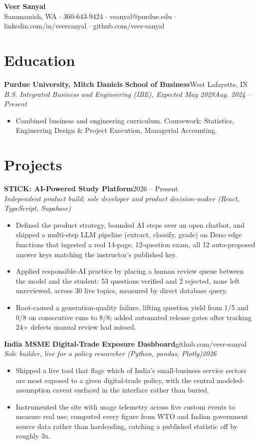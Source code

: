 \documentclass[10pt,letterpaper]{article}
\newcommand{\entry}[4]{%
  \textbf{#1}\hfill #2\\[1pt]
  \textit{#3}\hfill \textit{#4}\\[2pt]
}
\begin{document}
\begin{center}
  {\LARGE \textbf{Veer Sanyal}}\\[3pt]
  Sammamish, WA $\cdot$ 360-643-9424 $\cdot$ vsanyal@purdue.edu $\cdot$ linkedin.com/in/veersanyal $\cdot$ github.com/veer-sanyal
\end{center}

\section*{Education}
\textbf{Purdue University, Mitch Daniels School of Business}\hfill West Lafayette, IN\\[1pt]
\textit{B.S. Integrated Business and Engineering (IBE), Expected May 2028}\hfill \textit{Aug. 2024 -- Present}
\begin{itemize}
  \item Combined business and engineering curriculum. Coursework: Statistics, Engineering Design \& Project Execution, Managerial Accounting.
\end{itemize}

\section*{Projects}
\entry{STICK: AI-Powered Study Platform}{2026 -- Present}{Independent product build; sole developer and product decision-maker (React, TypeScript, Supabase)}{}
\begin{itemize}
  \item Defined the product strategy, bounded AI steps over an open chatbot, and shipped a multi-step LLM pipeline (extract, classify, grade) on Deno edge functions that ingested a real 14-page, 12-question exam, all 12 auto-proposed answer keys matching the instructor's published key.
  \item Applied responsible-AI practice by placing a human review queue between the model and the student: 53 questions verified and 2 rejected, none left unreviewed, across 30 live topics, measured by direct database query.
  \item Root-caused a generation-quality failure, lifting question yield from 1/5 and 0/8 on consecutive runs to 8/8; added automated release gates after tracking 24+ defects manual review had missed.
\end{itemize}

\entry{India MSME Digital-Trade Exposure Dashboard}{github.com/veer-sanyal}{Sole builder, live for a policy researcher (Python, pandas, Plotly)}{2026}
\begin{itemize}
  \item Shipped a live tool that flags which of India's small-business service sectors are most exposed to a given digital-trade policy, with the central modeled-assumption caveat surfaced in the interface rather than buried.
  \item Instrumented the site with usage telemetry across five custom events to measure real use; computed every figure from WTO and Indian government source data rather than hardcoding, catching a published statistic off by roughly 3x.
\end{itemize}
\end{document}
